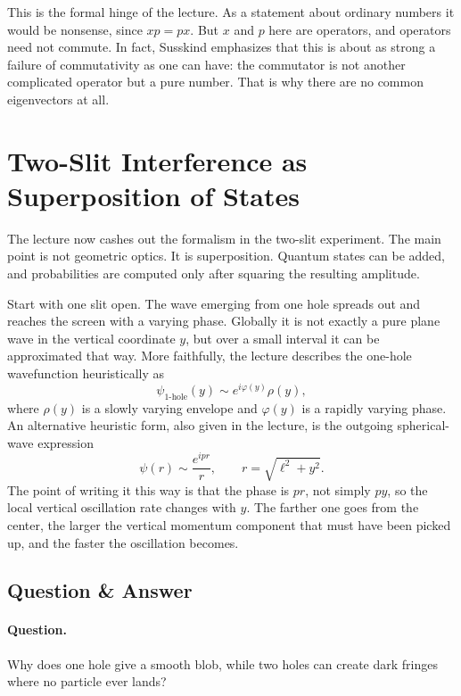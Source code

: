 This is the formal hinge of the lecture. As a statement about ordinary numbers it would be nonsense, since \(xp=px\). But \(x\) and \(p\) here are operators, and operators need not commute. In fact, Susskind emphasizes that this is about as strong a failure of commutativity as one can have: the commutator is not another complicated operator but a pure number. That is why there are no common eigenvectors at all.

\section{Two-Slit Interference as Superposition of States}

The lecture now cashes out the formalism in the two-slit experiment. The main point is not geometric optics. It is superposition. Quantum states can be added, and probabilities are computed only after squaring the resulting amplitude.

Start with one slit open. The wave emerging from one hole spreads out and reaches the screen with a varying phase. Globally it is not exactly a pure plane wave in the vertical coordinate \(y\), but over a small interval it can be approximated that way. More faithfully, the lecture describes the one-hole wavefunction heuristically as
\begin{equation}
\psi_{\text{1-hole}}(y)\sim e^{i\varphi(y)}\rho(y),
\end{equation}
where \(\rho(y)\) is a slowly varying envelope and \(\varphi(y)\) is a rapidly varying phase. An alternative heuristic form, also given in the lecture, is the outgoing spherical-wave expression
\begin{equation}
\psi(r)\sim \frac{e^{ipr}}{r},
\qquad
r=\sqrt{\ell^2+y^2}.
\end{equation}
The point of writing it this way is that the phase is \(pr\), not simply \(py\), so the local vertical oscillation rate changes with \(y\). The farther one goes from the center, the larger the vertical momentum component that must have been picked up, and the faster the oscillation becomes.

\subsection{Question \& Answer}

\paragraph{Question.} Why does one hole give a smooth blob, while two holes can create dark fringes where no particle ever lands?

